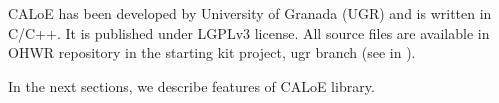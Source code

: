 CALoE has been developed by University of Granada (UGR) and is written in C/C++. It is published under LGPLv3 license. All source files are available in OHWR repository in the starting kit project, ugr branch (see in \cite{WR-starting-kit}).

In the next sections, we describe features of CALoE library.
